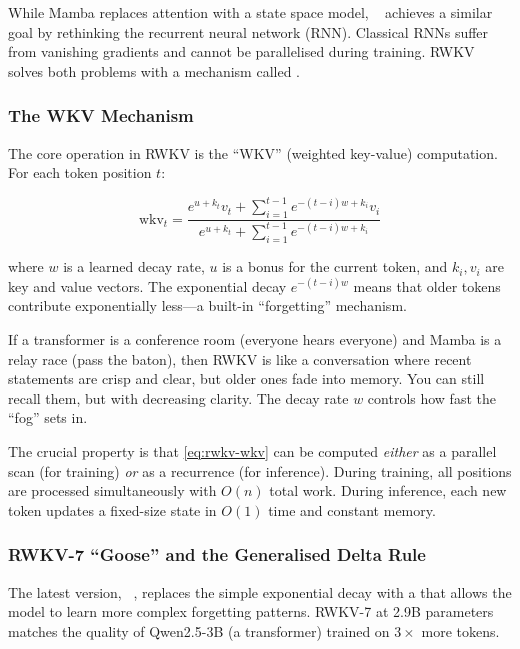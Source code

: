 While Mamba replaces attention with a state space model,
~\cite{peng2023rwkv} achieves a similar goal by
rethinking the recurrent neural network (RNN). Classical RNNs suffer
from vanishing gradients and cannot be parallelised during training.
RWKV solves both problems with a mechanism called
.

\subsubsection{The WKV Mechanism}

The core operation in RWKV is the ``WKV'' (weighted key-value)
computation. For each token position $t$:

\begin{equation}
  \text{wkv}_t = \frac{
    e^{u + k_t} v_t + \sum_{i=1}^{t-1} e^{-(t-i)w + k_i} v_i
  }{
    e^{u + k_t} + \sum_{i=1}^{t-1} e^{-(t-i)w + k_i}
  }
  \label{eq:rwkv-wkv}
\end{equation}

where $w$ is a learned decay rate, $u$ is a bonus for the current
token, and $k_i, v_i$ are key and value vectors. The exponential
decay $e^{-(t-i)w}$ means that older tokens contribute
exponentially less---a built-in ``forgetting'' mechanism.

\begin{analogy}
If a transformer is a conference room (everyone hears everyone) and
Mamba is a relay race (pass the baton), then RWKV is like a
conversation where recent statements are crisp and clear, but older
ones fade into memory. You can still recall them, but with
decreasing clarity. The decay rate $w$ controls how fast the ``fog''
sets in.
\end{analogy}

The crucial property is that \cref{eq:rwkv-wkv} can be computed
\emph{either} as a parallel scan (for training) \emph{or} as a
recurrence (for inference). During training, all positions are
processed simultaneously with $O(n)$ total work. During inference,
each new token updates a fixed-size state in $O(1)$ time and
constant memory.

\subsubsection{RWKV-7 ``Goose'' and the Generalised Delta Rule}

The latest version, ~\cite{peng2025rwkv7}, replaces
the simple exponential decay with a 
that allows the model to learn more complex forgetting patterns.
RWKV-7 at 2.9B parameters matches the quality of Qwen2.5-3B (a
transformer) trained on $3\times$ more tokens.

